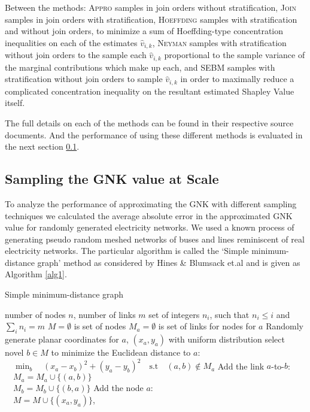 Between the methods: \textsc{Appro} samples in join orders without stratification, \textsc{Join} samples in join orders with stratification, \textsc{Hoeffding} samples with stratification and without join orders, to minimize a sum of Hoeffding-type concentration inequalities on each of the estimates $\hat{v}_{i,k}$,
\textsc{Neyman} samples with stratification without join orders to the sample each $\hat{v}_{i,k}$ proportional to the sample variance of the marginal contributions which make up each,
and \textsc{SEBM} samples with stratification without join orders to sample $\hat{v}_{i,k}$ in order to maximally reduce a complicated concentration inequality on the resultant estimated Shapley Value itself.

The full details on each of the methods can be found in their respective source documents.\cite{CASTRO2017180,2013arXiv1306.4265M,burgess2,DBLP:journals/cor/CastroGT09}
And the performance of using these different methods is evaluated in the next section \ref{section:performance}.

\subsection{Sampling the GNK value at Scale}\label{section:performance}

To analyze the performance of approximating the GNK with different sampling techniques we calculated the average absolute error in the approximated GNK value for randomly generated electricity networks.
We used a known process of generating pseudo random meshed networks of buses and lines reminiscent of real electricity networks. The particular algorithm is called the `Simple minimum-distance graph' method as considered by Hines \& Blumsack et.al \cite{hines1} and is given as Algorithm \ref{alg1}.

\begin{algorithm}[]
\caption{Simple minimum-distance graph}
\label{alg1}
\begin{algorithmic}
    \REQUIRE number of nodes $n$, number of links $m$
    \REQUIRE set of integers $n_i$, such that $n_i\leq i$ and $\sum_in_i=m$
    \STATE $M=\emptyset$ is set of nodes
    \STATE $M_a=\emptyset$ is set of links for nodes for $a$
        \STATE Randomly generate planar coordinates for $a$, $(x_a ,y_a)$ with uniform distribution
            \STATE select novel $b\in M$ to minimize the Euclidean distance to $a$:\\ $\quad\min_b\quad (x_a-x_b)^2+(y_a-y_b)^2\quad\text{s.t}\quad (a, b)\notin M_a$
            \STATE Add the link $a$-to-$b$:\\ $\quad M_a=M_a\cup \{(a, b)\}$\\ $\quad M_b=M_b\cup \{(b, a)\}$
        \ENDFOR
        \STATE Add the node $a$:\\ $\quad M=M\cup \{(x_a ,y_a)\}$, 
    \ENDFOR
\end{algorithmic}
\end{algorithm}

